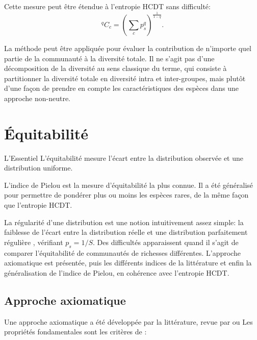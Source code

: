 \documentclass[
  11pt,
  french,
  a4paper,
  extrafontsizes,onecolumn,openright
  ]{memoir}
\newenvironment{Summary}
  {\begin{bclogo}[logo=\bctrombone, noborder=true, couleur=lightgray!50]{L'Essentiel}\parindent0pt}
  {\end{bclogo}}
\newlength{\rf}
\begin{document}
Cette mesure peut être étendue à l'entropie HCDT sans difficulté:
\begin{equation}
  \label{eq:Ccq}
  \mathit{^{q}\!C_{c}} = {\left(\sum_c{p^q_s}\right)}^{\frac{1}{1-q}}.
\end{equation}

La méthode peut être appliquée pour évaluer la contribution de n'importe quel partie de la communauté à la diversité totale.
Il ne s'agit pas d'une décomposition de la diversité au sens classique du terme, qui consiste à partitionner la diversité totale en diversité intra et inter-groupes, mais plutôt d'une façon de prendre en compte les caractéristiques des espèces dans une approche non-neutre.

\hypertarget{sec:Equitabilite}{%
\chapter{Équitabilité}\label{sec:Equitabilite}}

\scriptsize

\begin{Summary}
L'équitabilité mesure l'écart entre la distribution observée et une
distribution uniforme.

L'indice de Pielou est la mesure d'équitabilité la plus connue. Il a été
généralisé pour permettre de pondérer plus ou moins les espèces rares,
de la même façon que l'entropie HCDT.
\end{Summary}

\normalsize

La régularité d'une distribution est une notion intuitivement assez simple: la faiblesse de l'écart entre la distribution réelle et une distribution parfaitement régulière \autocite{Lloyd1964}, vérifiant \(p_s={1}/{S}\).
Des difficultés apparaissent quand il s'agit de comparer l'équitabilité de communautés de richesses différentes.
L'approche axiomatique est présentée, puis les différents indices de la littérature et enfin la généralisation de l'indice de Pielou, en cohérence avec l'entropie HCDT.

\hypertarget{approche-axiomatique}{%
\section{Approche axiomatique}\label{approche-axiomatique}}

Une approche axiomatique a été développée par la littérature, revue par \textcite{Jost2010} ou \textcite{Tuomisto2012} Les propriétés fondamentales sont les critères de \textcite{Dalton1920}:
\end{document}
